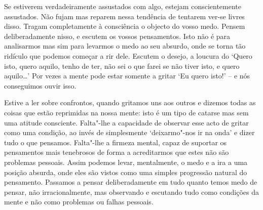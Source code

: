 Se estiverem verdadeiramente assustados com algo, estejam
conscientemente assustados. Não fujam mas reparem nessa tendência de
tentarem ver-se livres disso. Tragam \mbox{completamente} à consciência o objecto
do vosso medo. Pensem deliberadamente nisso, e escutem os vossos
pensamentos. Isto não é para analisarmos mas sim para levarmos o medo ao
seu absurdo, onde se torna tão ridículo que podemos começar a rir dele.
Escutem o desejo, a loucura do `Quero isto, quero aquilo, tenho de ter,
não sei o que farei se não tiver isto, e quero aquilo\ldots{}' Por
vezes a mente pode estar somente a gritar `Eu quero isto!' -- e nós
conseguimos ouvir isso.

Estive a ler sobre confrontos, quando gritamos uns aos outros e dizemos
todas as coisas que estão reprimidas na nossa
mente: isto é um tipo de catarse mas sem uma atitude consciente.
Falta"-lhe a capacidade de observar esse acto de gritar como uma
condição, ao invés de simplesmente `deixarmo"-nos ir na onda' e dizer
tudo o que pensamos. Falta"-lhe a firmeza mental, capaz de suportar os
pensamentos mais tenebrosos de forma a acreditarmos que estes não são
problemas pessoais. Assim podemos levar, mentalmente, o medo e a ira a
uma posição absurda, onde eles são vistos como uma simples progressão
natural do pensamento. Passamos a pensar deliberadamente em tudo quanto
temos medo de pensar, não irracionalmente, mas observando e escutando
tudo como condições da mente e não como problemas ou falhas pessoais.

